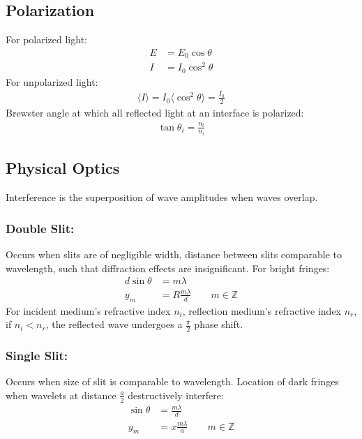 \documentclass[11pt]{article}
\begin{document}
\begin{multicols*}{3}
\subsection{Polarization}
For polarized light:
\begin{align*}
E&=E_0\cos{\theta} \\
I&=I_0\cos^2{\theta}
\end{align*}
For unpolarized light:
\begin{align*}
\langle I \rangle=I_0 \langle \cos^2{\theta} \rangle = \frac{I_0}{2}
\end{align*}
Brewster angle at which all reflected light at an interface is polarized:
\begin{align*}
\tan{\theta_i}=\frac{n_t}{n_i}
\end{align*}
\subsection{Physical Optics}
Interference is the superposition of wave amplitudes when waves overlap.
\subsubsection{Double Slit:}
Occurs when slits are of negligible width, distance between slits comparable to wavelength, such that diffraction effects are insignificant. For bright fringes:
\begin{align*}
d\sin{\theta}&=m\lambda \\
y_m&=R\frac{m\lambda}{d} \qquad m \in \mathbb{Z}
\end{align*}
For incident medium's refractive index $n_i$, reflection medium's refractive index $n_r$, if $n_i < n_r$, the reflected wave undergoes a $\frac{\pi}{2}$ phase shift.
\subsubsection{Single Slit:}
Occurs when size of slit is comparable to wavelength. Location of dark fringes when wavelets at distance $\frac{a}{2}$ destructively interfere:
\begin{align*}
\sin{\theta}&=\frac{m\lambda}{d} \\
y_m&=x\frac{m\lambda}{a} \qquad m \in \mathbb{Z}
\end{align*}

\end{multicols*}
\end{document}
